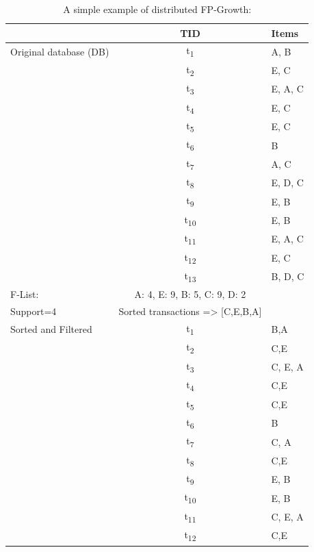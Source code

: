\begin{table}[h!]
  \begin{center}
    \caption{A simple example of distributed FP-Growth:}
    \label{tab:table2}
    \begin{tabular}{l|c|l} %
      \textbf{} & \textbf{TID} & \textbf{Items}\\
      \hline
      Original database (DB) & t\textsubscript{1} & {A, B}\\
       & t\textsubscript{2} & {E, C}\\
        & t\textsubscript{3} & {E, A, C}\\
	   & t\textsubscript{4} & {E, C}\\
       & t\textsubscript{5} & {E, C}\\
        & t\textsubscript{6} & {B}\\
	   & t\textsubscript{7} & {A, C}\\
       & t\textsubscript{8} & {E, D, C}\\
        & t\textsubscript{9} &{E, B} \\
	   & t\textsubscript{10} & {E, B}\\
       & t\textsubscript{11} & {E, A, C}\\
        & t\textsubscript{12} & {E, C}\\
	   & t\textsubscript{13} & {B, D, C}\\
	  F-List: & A: 4, E: 9, B: 5, C: 9, D: 2 & \\
	  		\hline
	  Support=4 & Sorted transactions => [C,E,B,A] & \\
	  		\hline
	  Sorted and Filtered & t\textsubscript{1} & {B,A}\\
       & t\textsubscript{2} & {C,E}\\
        & t\textsubscript{3} & {C, E, A}\\
	   & t\textsubscript{4} & {C,E}\\
       & t\textsubscript{5} & {C,E}\\
        & t\textsubscript{6} & {B}\\
	   & t\textsubscript{7} & {C, A}\\
       & t\textsubscript{8} & {C,E}\\
        & t\textsubscript{9} &{E, B} \\
	   & t\textsubscript{10} & {E, B}\\
       & t\textsubscript{11} & {C, E, A}\\
        & t\textsubscript{12} & {C,E}\\

\end{tabular}
\end{center}
\end{table}
